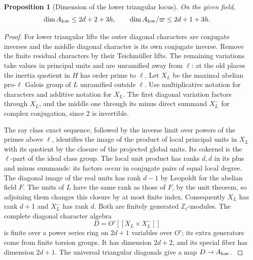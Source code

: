 \documentclass[a4paper,11pt]{article}
\newtheorem{proposition}{Proposition}[section]
\theoremstyle{definition}
\theoremstyle{remark}
\newcommand{\ZZ}{\mathbb Z}\newcommand{\ord}{\operatorname{ord}}
\numberwithin{equation}{section}
\begin{document}
\begin{proposition}[Dimension of the lower triangular locus]\leavevmode
\label{prop:lowerdimension421}
On the given field,
\[
              \dim A_{\rm low}\le 2d+2+3h,\qquad
              \dim A_{\rm low}/\varpi\le 2d+1+3h .
\]
\end{proposition}
\begin{proof}
For lower triangular lifts the outer diagonal characters are
conjugate inverses and the middle diagonal character is its
own conjugate inverse. Remove the finite residual characters
by their Teichm\"uller lifts. The remaining variations take
values in principal units and are unramified away from
\(\ell\): at the old places the inertia quotient in \(H\) has
order prime to \(\ell\). Let \(X_L\) be the maximal abelian
pro-\(\ell\) Galois group of \(L\) unramified outside \(\ell\).
Use multiplicative notation for characters and additive notation
for \(X_L\). The first diagonal variation factors through \(X_L\),
and the middle one through its minus direct summand \(X_L^-\)
for complex conjugation, since \(2\) is invertible.

The ray class exact sequence, followed by the inverse limit
over powers of the primes above \(\ell\), identifies the
image of the product of local principal units in \(X_L\)
with its quotient by the closure of the projected global
units. Its cokernel is the \(\ell\)-part of the ideal class
group. The local unit product has ranks \(d,d\) in its plus
and minus summands: its factors occur in conjugate pairs of
equal local degree. The diagonal image of the real units has
rank \(d-1\) by Leopoldt for the abelian field \(F\). The
units of \(L\) have the same rank as those of \(F\), by the
unit theorem, so adjoining them changes this closure by at
most finite index. Consequently \(X_L\) has rank \(d+1\)
and \(X_L^-\) has rank \(d\). Both are finitely generated
\(\ZZ_\ell\)-modules. The complete diagonal character algebra
\[
                      D=O'[[X_L\times X_L^-]]
\]
is finite over a power series ring on \(2d+1\) variables
over \(O'\); its extra generators come from finite torsion
groups. It has dimension \(2d+2\), and its special fiber
has dimension \(2d+1\). The universal triangular diagonals
give a map \(D\to A_{\rm low}\).
\cite{IX-VII-brumer330}


\end{proof}
\end{document}
